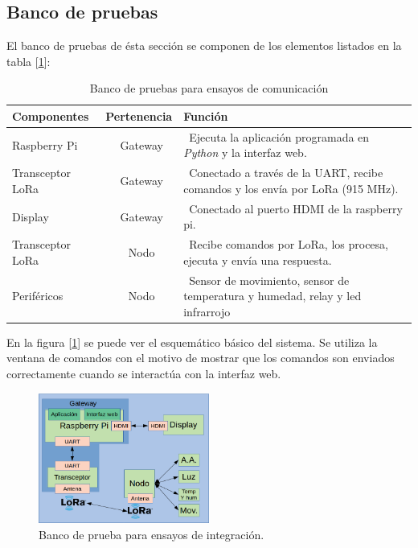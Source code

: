 \subsection{Banco de pruebas}

El banco de pruebas de ésta sección se componen de los elementos listados en la tabla [\ref{tab:bancodepruebas3}]:

\begin{table}[h]
	\centering
	\caption[Banco de pruebas 3]{Banco de pruebas para ensayos de comunicación}
	\begin{tabular}{l c m{7.5cm}}    
		\toprule
		\textbf{Componentes}  		& \textbf{Pertenencia}     	& \textbf{Función}																				\\
		\midrule
		Raspberry Pi				& \ Gateway 				& \ Ejecuta la aplicación programada en {\textit{Python}} y la interfaz web.	\\
		Transceptor LoRa 			& \ Gateway					& \ Conectado a través de la UART, recibe comandos y los envía por LoRa (915 MHz). 				\\
		Display	 					& \ Gateway 				& \ Conectado al puerto HDMI de la raspberry pi. 												\\
		Transceptor LoRa		 	& \ Nodo 					& \ Recibe comandos por LoRa, los procesa, ejecuta y envía una respuesta.						\\
		Periféricos		 			& \ Nodo 					& \ Sensor de movimiento, sensor de temperatura y humedad, relay y led infrarrojo				\\
		\bottomrule
		\hline
	\end{tabular}
	\label{tab:bancodepruebas3}
\end{table}

En la figura [\ref{fig:bancodepruebas3}] se puede ver el esquemático básico del sistema. Se utiliza la ventana de comandos con el motivo de mostrar que los comandos son enviados correctamente cuando se interactúa con la interfaz web. 

\begin{figure}[ht!]
	\centering
	\includegraphics[width=0.5\textwidth]{./Figures/bancodepruebas2.png}
	\caption{Banco de prueba para ensayos de integración.}
	\label{fig:bancodepruebas3}
\end{figure}


